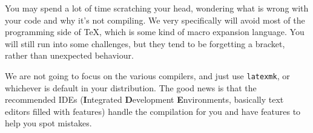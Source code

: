     You may spend a lot of time scratching your head, wondering what is wrong with your code and why it's not compiling.
    We very specifically will avoid most of the programming side of \TeX, which is some kind of macro expansion language.
    You will still run into some challenges, but they tend to be forgetting a bracket, rather than unexpected behaviour.

    We are not going to focus on the various compilers, and just use \texttt{latexmk}, or whichever is default in your distribution.
    The good news is that the recommended IDEs (\textbf{I}ntegrated \textbf{D}evelopment \textbf{E}nvironments, basically text editors filled with features) handle the compilation for you and have features to help you spot mistakes.